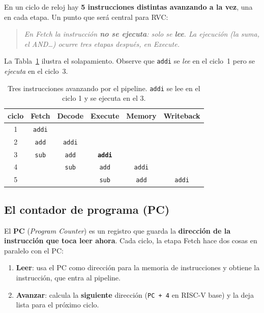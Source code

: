 \documentclass[11pt]{article}
\newcommand{\code}[1]{\texttt{#1}}
\begin{document}
\noindent
En un ciclo de reloj hay \textbf{5 instrucciones distintas avanzando a la vez},
una en cada etapa. Un punto que será central para RVC:

\begin{quote}
\itshape
En \emph{Fetch} la instrucción \textbf{no se ejecuta}: solo se \textbf{lee}. La
ejecución (la suma, el AND\dots) ocurre tres etapas después, en \emph{Execute}.
\end{quote}

La Tabla~\ref{tab:flujo} ilustra el solapamiento. Observe que \code{addi} se
\emph{lee} en el ciclo~1 pero se \emph{ejecuta} en el ciclo~3.

\begin{table}[H]
\centering
\small
\begin{tabular}{@{}cccccc@{}}
\toprule
ciclo & Fetch & Decode & Execute & Memory & Writeback \\
\midrule
1 & \code{addi} &             &             &             &  \\
2 & \code{add}  & \code{addi} &             &             &  \\
3 & \code{sub}  & \code{add}  & \textbf{\code{addi}} &    &  \\
4 &             & \code{sub}  & \code{add}  & \code{addi} &  \\
5 &             &             & \code{sub}  & \code{add}  & \code{addi} \\
\bottomrule
\end{tabular}
\caption{Tres instrucciones avanzando por el pipeline. \code{addi} se lee en el
ciclo 1 y se ejecuta en el 3.}
\label{tab:flujo}
\end{table}

\subsection{El contador de programa (PC)}

El \textbf{PC} (\emph{Program Counter}) es un registro que guarda la
\textbf{dirección de la instrucción que toca leer ahora}. Cada ciclo, la etapa
Fetch hace dos cosas en paralelo con el PC:

\begin{enumerate}[noitemsep, leftmargin=1.6em]
  \item \textbf{Leer}: usa el PC como dirección para la memoria de instrucciones
        y obtiene la instrucción, que entra al pipeline.
  \item \textbf{Avanzar}: calcula la \textbf{siguiente} dirección
        (\code{PC + 4} en RISC-V base) y la deja lista para el próximo ciclo.
\end{enumerate}
\end{document}
